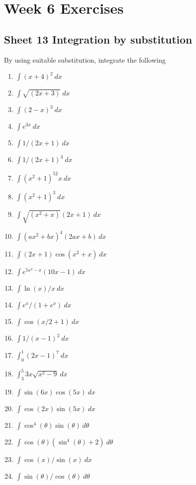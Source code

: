 \documentclass[
  11pt,
  oneside]{book}
\providecommand{\tightlist}{%
  \setlength{\itemsep}{0pt}\setlength{\parskip}{0pt}}
\theoremstyle{definition}
\theoremstyle{definition}
\theoremstyle{definition}
\theoremstyle{definition}
\theoremstyle{remark}
\begin{document}
\chapter*{Week 6 Exercises}\label{week-6-exercises}

\section{Sheet 13 Integration by substitution}\label{sheet-13-integration-by-substitution}

By using suitable substitution, integrate the following

\begin{enumerate}
\def\labelenumi{\arabic{enumi}.}
\tightlist
\item
  \(\int (x+4)^2\ dx\)
\item
  \(\int \sqrt{(2x+3)}\ dx\)
\item
  \(\int (2-x)^3\ dx\)
\item
  \(\int e^{3x}\ dx\)
\item
  \(\int 1/(2x+1)\ dx\)
\item
  \(\int 1/(2x+1)^3\ dx\)
\item
  \(\int (x^2+1)^52x \ dx\)
\item
  \(\int (x^2+1)^3\ dx\)
\item
  \(\int \sqrt{(x^2+x)}(2x+1) \ dx\)
\item
  \(\int (ax^2+bx)^4(2ax+b)\ dx\)
\item
  \(\int (2x+1)\cos(x^2+x) \ dx\)
\item
  \(\int e^{5x^2-x}(10x-1)\ dx\)
\item
  \(\int \ln(x)/x \ dx\)
\item
  \(\int e^x/(1+e^x)\ dx\)
\item
  \(\int \cos(x/2+1)\ dx\)
\item
  \(\int 1/(x-1)^2\ dx\)
\item
  \(\int_0^1 (2x-1)^7\ dx\)
\item
  \(\int_3^5 3x\sqrt{x^2-9}\ dx\)
\item
  \(\int\sin(6x)\cos(5x) \ dx\)
\item
  \(\int \cos(2x)\sin(5x)\ dx\)
\item
  \(\int \cos^4(\theta)\sin(\theta)\ d\theta\)
\item
  \(\int \cos(\theta)(\sin^4(\theta)+2)\ d\theta\)
\item
  \(\int \cos(x)/\sin(x)\ dx\)
\item
  \(\int \sin(\theta)/\cos(\theta)\ d\theta\)

\end{enumerate}
\end{document}
